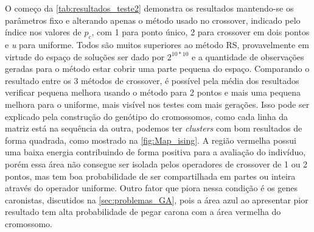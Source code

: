 O começo da \autoref{tab:resultados_teste2} demonstra os resultados mantendo-se os parâmetros fixo e alterando apenas o método usado no crossover, indicado pelo índice nos valores de \(p_c\), com 1 para ponto único, 2 para crossover em dois pontos e \textit{u} para uniforme. Todos são muitos superiores ao método RS, provavelmente em virtude do espaço de soluções ser dado por \(2^{10*10}\) e a quantidade de observações geradas para o método estar cobrir uma parte pequena do espaço. Comparando o resultado entre os 3 métodos de crossover, é possível pela média dos resultados verificar pequena melhora usando o método para 2 pontos e mais uma pequena melhora para o uniforme, mais visível nos testes com mais gerações. Isso pode ser explicado pela construção do genótipo do cromossomos, como cada linha da matriz está na sequência da outra, podemos ter \textit{clusters} com bom resultados de forma quadrada, como mostrado na \autoref{fig:Map_ising}. A região vermelha possui uma baixa energia contribuindo de forma positiva para a avaliação do indivíduo, porém essa área não consegue ser isolada pelos operadores de crossover de 1 ou 2 pontos, mas tem boa probabilidade de ser compartilhada em partes ou inteira através do operador uniforme. Outro fator que piora nessa condição é os genes caronistas, discutidos na \autoref{sec:problemas_GA}, pois a área azul ao apresentar pior resultado tem alta probabilidade de pegar carona com a área vermelha do cromossomo.

